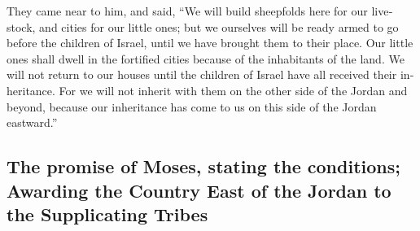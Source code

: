 \begin{paracol}{2}
\begin{otherlanguage}{english}
 They came near to him, and said, ``We will build
sheepfolds here for our livestock, and cities for our little ones;
 but we ourselves will be ready armed to go before the
children of Israel, until we have brought them to their place. Our
little ones shall dwell in the fortified cities because of the
inhabitants of the land.  We will not return to our
houses until the children of Israel have all received their inheritance.
 For we will not inherit with them on the other side of
the Jordan and beyond, because our inheritance has come to us on this
side of the Jordan eastward.''

\hypertarget{the-promise-of-moses-stating-the-conditions-awarding-the-country-east-of-the-jordan-to-the-supplicating-tribes}{%
\subsection{The promise of Moses, stating the conditions; Awarding the
Country East of the Jordan to the Supplicating
Tribes}\label{the-promise-of-moses-stating-the-conditions-awarding-the-country-east-of-the-jordan-to-the-supplicating-tribes}}


\end{otherlanguage}
\end{paracol}

